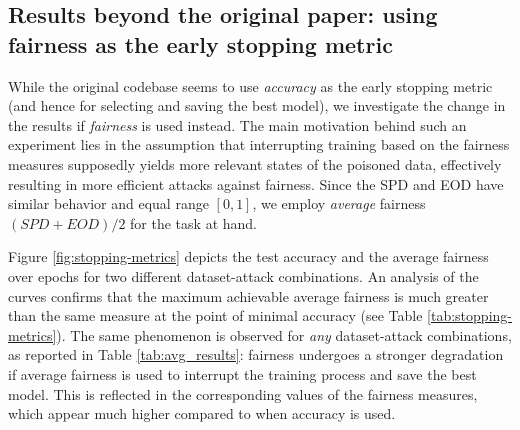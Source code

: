 \subsection{Results beyond the original paper: using fairness as the early stopping metric}
While the original codebase seems to use \textit{accuracy} as the early stopping metric (and hence for selecting and saving the best model), we investigate the change in the results if \textit{fairness} is used instead. The main motivation behind such an experiment lies in the assumption that interrupting training based on the fairness measures supposedly yields more relevant states of the poisoned data, effectively resulting in more efficient attacks against fairness. Since the SPD and EOD have similar behavior and equal range $[0,1]$, we employ \textit{average} fairness $(SPD + EOD)/2$ for the task at hand. 

Figure \ref{fig:stopping-metrics} depicts the test accuracy and the average fairness over epochs for two different dataset-attack combinations. An analysis of the curves confirms that the maximum achievable average fairness is much greater than the same measure at the point of minimal accuracy (see Table \ref{tab:stopping-metrics}). The same phenomenon is observed for \textit{any} dataset-attack combinations, as reported in Table \ref{tab:avg_results}: fairness undergoes a stronger degradation if average fairness is used to interrupt the training process and save the best model. This is reflected in the corresponding values of the fairness measures, which appear much higher compared to when accuracy is used.

